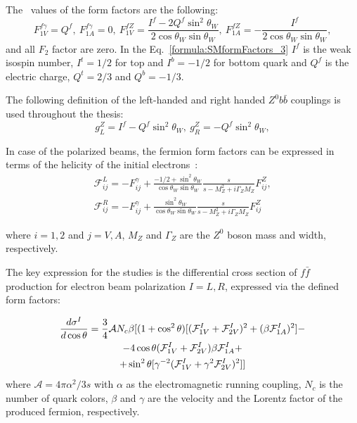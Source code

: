 The \sm\ values of the form factors are the following:
\begin{equation}
F^{f\gamma}_{1V} = Q^{f}, \ F^{f\gamma}_{1A} = 0, \ F^{fZ}_{1V} = \frac{I^f - 2Q^f\sin^2\theta_W}{2\cos\theta_W\sin\theta_W}, \ F^{fZ}_{1A} = - \frac{I^f}{2\cos\theta_W\sin\theta_W},
\label{formula:SMformFactors_3}
\end{equation}
and all $F_2$ factor are zero. In the Eq.~\ref{formula:SMformFactors_3} $I^f$ is the weak isospin number, $I^t = 1/2$ for top and $I^b = -1/2$ for bottom quark and $Q^f$ is the electric charge, $Q^t = 2/3$ and $Q^b = -1/3$.

The following definition of the left-handed and right handed $Z^0b\bar{b}$ couplings is used throughout the thesis: 
\begin{equation}
g_L^Z = I^f - Q^f\sin^2\theta_W, \  g_R^Z = -Q^f\sin^2\theta_W, 
\label{formula:EWcouplings_3}
\end{equation}

In case of the polarized beams, the fermion form factors can be expressed in terms of the helicity of the initial electrons~\cite{bib:Schmidt}:
\begin{eqnarray}
\mathcal{F}^L_{ij} = - F^\gamma_{ij} +  \frac{-1/2 + \sin^2\theta_W}{\cos\theta_W\sin\theta_W}\frac{s}{s-M^2_Z+i\Gamma_ZM_Z}F^Z_{ij},\\
\mathcal{F}^R_{ij} = - F^\gamma_{ij} +  \frac{\sin^2\theta_W}{\cos\theta_W\sin\theta_W}\frac{s}{s-M^2_Z+i\Gamma_ZM_Z}F^Z_{ij}    
\label{formula:PolFF_3}
\end{eqnarray}

where $i=1,2$ and $j=V,A$, $M_Z$ and $\Gamma_Z$ are the $Z^0$ boson mass and width, respectively.

The key expression for the studies is the differential cross section of $f\bar{f}$ production for electron beam polarization $I=L,R$, expressed via the defined form factors:

\begin{multline}
\label{formula:DiffSigma_3}
\frac{d\sigma^I}{d\cos\theta} = \frac{3}{4} \mathcal{A} N_c \beta[ (1+\cos^2\theta) [(\mathcal{F}^I_{1V}+\mathcal{F}^I_{2V})^2+(\beta \mathcal{F}^I_{1A})^2] - \\-4 \cos\theta (\mathcal{F}^I_{1V}+\mathcal{F}^I_{2V})\beta \mathcal{F}^I_{1A} +\\+ \sin^2\theta [\gamma ^{-2} (\mathcal{F}^I_{1V} +\gamma^2 \mathcal{F}^I_{2V})^2] ]
\end{multline}
where $\mathcal{A} = 4\pi\alpha^2/3s$ with $\alpha$ as the electromagnetic running coupling, $N_c$ is the number of quark colors, $\beta$ and $\gamma$ are the velocity and the Lorentz factor of the produced fermion, respectively. 

